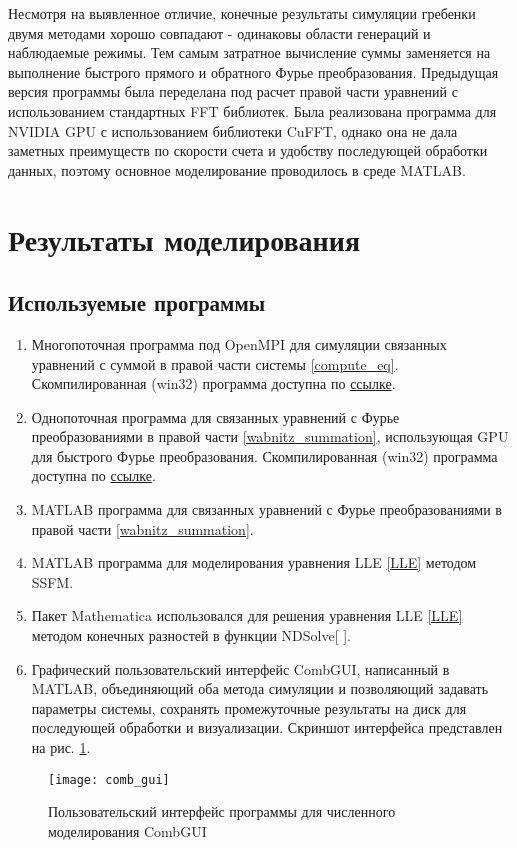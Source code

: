 Несмотря на выявленное отличие, конечные результаты симуляции гребенки двумя методами хорошо совпадают - одинаковы области генераций и наблюдаемые режимы. Тем самым затратное вычисление суммы заменяется на выполнение быстрого прямого и обратного Фурье преобразования. Предыдущая версия программы была переделана под расчет правой части уравнений с использованием стандартных FFT библиотек. Была реализована программа для NVIDIA GPU с использованием библиотеки CuFFT, однако она не дала заметных преимуществ по скорости счета и удобству последующей обработки данных, поэтому основное моделирование проводилось в среде MATLAB.

\section{Результаты моделирования}
\subsection{Используемые программы}
\begin{enumerate}
\item
Многопоточная программа под OpenMPI для симуляции связанных уравнений с суммой в правой части системы \eqref{compute_eq}. Скомпилированная (win32) программа доступна по \href{https://www.dropbox.com/sh/940djjdx3ojcsxy/_1JZsWTqPN/mpi}{ссылке}.
\item
Однопоточная программа для связанных уравнений с Фурье преобразованиями в правой части \eqref{wabnitz_summation}, использующая GPU для быстрого Фурье преобразования. Скомпилированная (win32) программа доступна по \href{https://www.dropbox.com/sh/940djjdx3ojcsxy/n4hBUtto1o/gpu}{ссылке}.
\item
MATLAB программа для связанных уравнений с Фурье преобразованиями в правой части \eqref{wabnitz_summation}.
\item
MATLAB программа для моделирования уравнения LLE \eqref{LLE} методом SSFM.
\item
Пакет Mathematica использовался для решения уравнения LLE \eqref{LLE} методом конечных разностей в функции NDSolve[ ].
\item Графический пользовательский интерфейс CombGUI, написанный в MATLAB, объединяющий оба метода симуляции и позволяющий задавать параметры системы, сохранять промежуточные результаты на диск для последующей обработки и визуализации. Скриншот интерфейса представлен на рис. \ref{comb_gui}.
\end{enumerate}
\begin{figure}
 \centering
 \texttt{[image: comb\_gui]}
 \caption{Пользовательский интерфейс программы для численного моделирования CombGUI} \label{comb_gui}
\end{figure}

